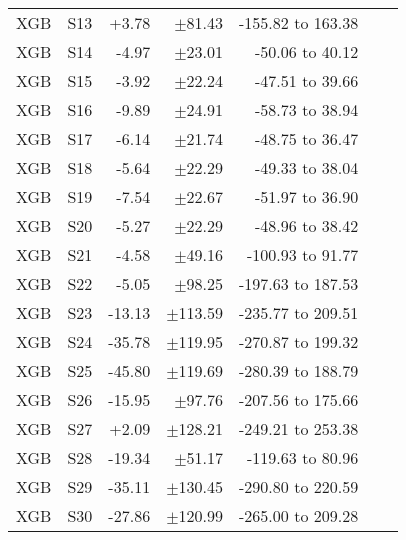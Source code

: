 \begin{table}
\begin{tabular}{rrrrrrr}
  XGB &  S13 &  +3.78 &  $\pm$81.43 & -155.82 to 163.38 \\
  XGB &  S14 &  -4.97 &  $\pm$23.01 &   -50.06 to 40.12 \\
  XGB &  S15 &  -3.92 &  $\pm$22.24 &   -47.51 to 39.66 \\
  XGB &  S16 &  -9.89 &  $\pm$24.91 &   -58.73 to 38.94 \\
  XGB &  S17 &  -6.14 &  $\pm$21.74 &   -48.75 to 36.47 \\
  XGB &  S18 &  -5.64 &  $\pm$22.29 &   -49.33 to 38.04 \\
  XGB &  S19 &  -7.54 &  $\pm$22.67 &   -51.97 to 36.90 \\
  XGB &  S20 &  -5.27 &  $\pm$22.29 &   -48.96 to 38.42 \\
  XGB &  S21 &  -4.58 &  $\pm$49.16 &  -100.93 to 91.77 \\
  XGB &  S22 &  -5.05 &  $\pm$98.25 & -197.63 to 187.53 \\
  XGB &  S23 & -13.13 & $\pm$113.59 & -235.77 to 209.51 \\
  XGB &  S24 & -35.78 & $\pm$119.95 & -270.87 to 199.32 \\
  XGB &  S25 & -45.80 & $\pm$119.69 & -280.39 to 188.79 \\
  XGB &  S26 & -15.95 &  $\pm$97.76 & -207.56 to 175.66 \\
  XGB &  S27 &  +2.09 & $\pm$128.21 & -249.21 to 253.38 \\
  XGB &  S28 & -19.34 &  $\pm$51.17 &  -119.63 to 80.96 \\
  XGB &  S29 & -35.11 & $\pm$130.45 & -290.80 to 220.59 \\
  XGB &  S30 & -27.86 & $\pm$120.99 & -265.00 to 209.28 \\
\bottomrule
\end{tabular}
\end{table}
